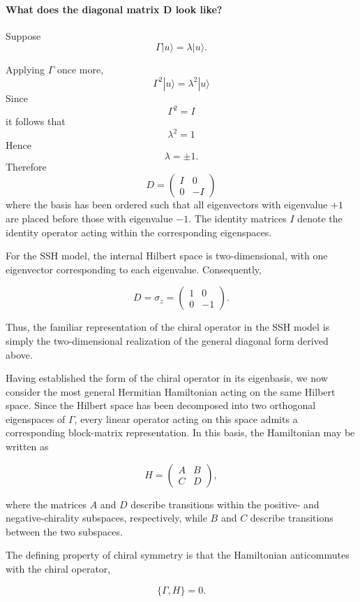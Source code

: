 \documentclass[11pt, a4paper]{article}
\begin{document}
\paragraph{What does the diagonal matrix D look like?} 
Suppose \[ \Gamma |u\rangle = \lambda|u\rangle.\]

Applying $\Gamma$ once more,
\[
    \Gamma^2|u\rangle = \lambda^2|u\rangle
\]
Since
    \[
        \Gamma^2 = I
    \]
it follows that
\[
    \lambda^2 =1
\]
Hence
\[
    \lambda = \pm1.
\]
Therefore
\[
    D = \begin{pmatrix}
        I & 0\\
        0 & -I
    \end{pmatrix}
\]
where the basis has been ordered such that all eigenvectors with eigenvalue $+1$ are placed before those with eigenvalue $-1$. The identity matrices $I$ denote the identity operator acting within the corresponding eigenspaces.


For the SSH model, the internal Hilbert space is two-dimensional, with one eigenvector corresponding to each eigenvalue. Consequently,

\[
D=\sigma_z=
\begin{pmatrix}
1&0\\
0&-1
\end{pmatrix}.
\]

Thus, the familiar representation of the chiral operator in the SSH model is simply the two-dimensional realization of the general diagonal form derived above.

Having established the form of the chiral operator in its eigenbasis, we now consider the most general Hermitian Hamiltonian acting on the same Hilbert space. Since the Hilbert space has been decomposed into two orthogonal eigenspaces of $\Gamma$, every linear operator acting on this space admits a corresponding block-matrix representation. In this basis, the Hamiltonian may be written as

\[
H=
\begin{pmatrix}
A&B\\
C&D
\end{pmatrix},
\]

where the matrices $A$ and $D$ describe transitions within the positive-
and negative-chirality subspaces, respectively, while $B$ and $C$
describe transitions between the two subspaces.

The defining property of chiral symmetry is that the Hamiltonian
anticommutes with the chiral operator,


\[
\{\Gamma,H\}=0.
\]
\end{document}
